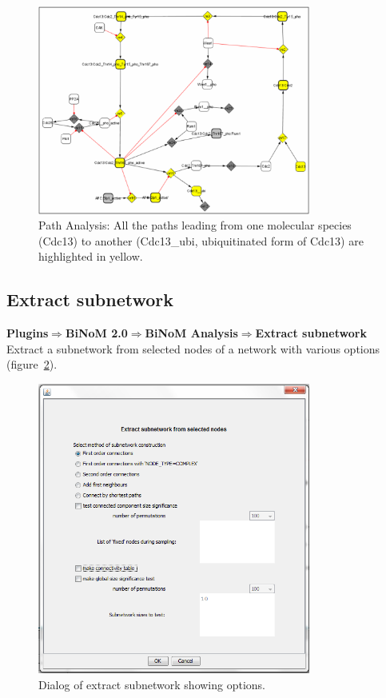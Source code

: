 \begin{figure}
\centering
\includegraphics[width=0.8\textwidth]{graphics/Path_Analysis_All_the_paths}
\caption{Path Analysis: All the paths leading from one molecular species (Cdc13) to another (Cdc13\_ubi, ubiquitinated form of Cdc13) are highlighted in yellow.}
\label{Path_Analysis_All_the_paths}
\end{figure}

\subsection{Extract subnetwork}
\textbf{Plugins$\Rightarrow$BiNoM 2.0$\Rightarrow$BiNoM Analysis$\Rightarrow$Extract subnetwork}\\
Extract a subnetwork from selected nodes of a network with various options (figure~\ref{Extract_subnetwork_dialog}).
\begin{figure}
\centering
\includegraphics[width=0.8\textwidth]{graphics/Extract_subnetwork_dialog}
\caption{Dialog of extract subnetwork showing options.}
\label{Extract_subnetwork_dialog}
\end{figure}

